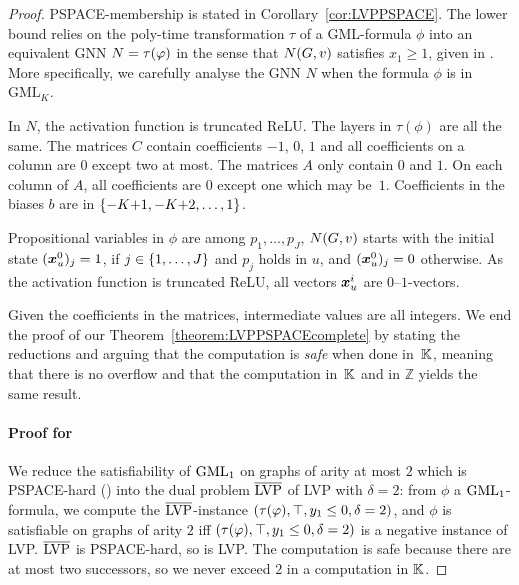 \begin{proof}
PSPACE-membership is stated in Corollary~\ref{cor:LVPPSPACE}. The lower bound relies on the poly-time transformation $\tau$ of a GML-formula $\phi$ into an equivalent GNN $N = \tau(\varphi)$ in the sense that $N(G, v)$ satisfies $x_1 \geq 1$, given in \citet [proof of Proposition~4.1]{DBLP:conf/iclr/BarceloKM0RS20}. More specifically, we carefully analyse the GNN $N$ when the formula $\phi$ is in $\text{GML}_K$.

In $N$, the activation function is truncated ReLU. 
The layers in $\tau(\phi)$ are all the same. The matrices $C$ contain coefficients $-1$, $0$, $1$ and all coefficients on a column are $0$ except two at most.
The matrices $A$ only contain $0$ and $1$. On each column of $A$, all coefficients are $0$ except one which may be~$1$.
Coefficients in the biases $b$ are in ${\{ -K{+}1, -K{+}2, \dots, 1\}}$. 


Propositional variables in $\phi$ are among $p_1, \dots, p_J$, 
$N(G, v)$ starts with the initial state 
$(\boldsymbol{x}^0_u)_j = 1$, if $j \in {\{1, \dots, J\}}$ and $p_j$ holds in $u$, and $(\boldsymbol{x}^0_u)_j = 0$ otherwise.
%
 As the activation function is truncated ReLU, all vectors $\boldsymbol{x}^i_u$ are $0$--$1$-vectors.
 
 
Given the coefficients in the matrices, intermediate values are all integers.%
%
We end the proof of our Theorem~\ref{theorem:LVPPSPACEcomplete} by stating the reductions and arguing that the computation is \emph{safe} when done in~$\mathbb K$, meaning that there is no overflow and that the computation in~$\mathbb K$ and in 
$\mathbb{Z}$ yields the same result.
    
\newcommand{\LVPdual}{\ensuremath{\compl{\text{LVP}}}\xspace}

\paragraph{Proof for \casezerotwoatwo} 
We reduce the satisfiability of $\text{GML}_1$ on graphs of arity at most $2$ which is PSPACE-hard () into the dual problem \LVPdual of LVP with $\delta {=} 2$: from $\phi$ a $\text{GML}_1$-formula, we compute the \LVPdual-instance $(\tau(\varphi), \top, y_1 \leq 0, \delta=2)$, and $\phi$ is satisfiable on graphs of arity $2$ iff $(\tau(\varphi), \top, y_1 \leq 0, \delta=2)$ is a negative instance of LVP. \LVPdual is PSPACE-hard, so is LVP. The computation is safe because there are at most two successors, so we never exceed $2$ in a computation in $\mathbb K$.


\end{proof}
